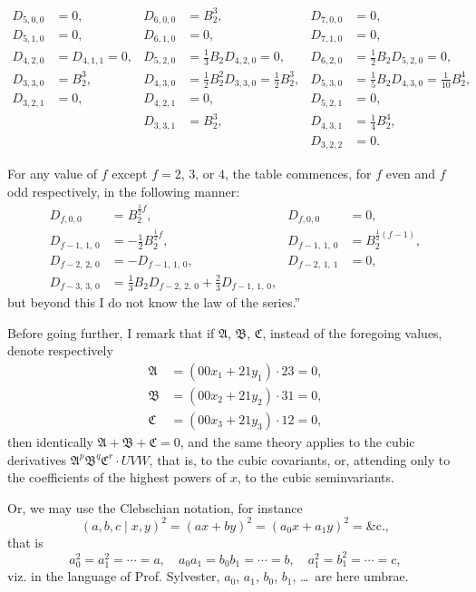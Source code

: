 \documentclass[11pt,a4paper]{article}
\theoremstyle{definition}
\begin{document}
\begin{align*}
D_{5,0,0} &= 0, & D_{6,0,0} &= B_2^3, & D_{7,0,0} &= 0,\\
D_{5,1,0} &= 0, & D_{6,1,0} &= 0, & D_{7,1,0} &= 0,\\
D_{4,2,0} &= D_{4,1,1} = 0, & D_{5,2,0} &= \tfrac{1}{3}B_2 D_{4,2,0} = 0, & D_{6,2,0} &= \tfrac{1}{2}B_2 D_{5,2,0} = 0,\\
D_{3,3,0} &= B_2^3, & D_{4,3,0} &= \tfrac{1}{2}B_2^2 D_{3,3,0} = \tfrac{1}{2}B_2^3, & D_{5,3,0} &= \tfrac{1}{5}B_2 D_{4,3,0} = \tfrac{1}{10}B_2^4,\\
D_{3,2,1} &= 0, & D_{4,2,1} &= 0, & D_{5,2,1} &= 0,\\
& & D_{3,3,1} &= B_2^3, & D_{4,3,1} &= \tfrac{1}{4}B_2^4,\\
& & & & D_{3,2,2} &= 0.
\end{align*}

For any value of $f$ except $f = 2$, $3$, or $4$, the table commences, for $f$ even and $f$ odd respectively, in the following manner:
\begin{align*}
D_{f,0,0} &= B_2^{\frac{1}{2}f}, & D_{f,0,0} &= 0,\\
D_{f-1,\,1,\,0} &= -\tfrac{1}{2}B_2^{\frac{1}{2}f}, & D_{f-1,\,1,\,0} &= B_2^{\frac{1}{2}(f-1)},\\
D_{f-2,\,2,\,0} &= -D_{f-1,\,1,\,0}, & D_{f-2,\,1,\,1} &= 0,\\
D_{f-3,\,3,\,0} &= \tfrac{1}{3}B_2 D_{f-2,\,2,\,0} + \tfrac{2}{3}D_{f-1,\,1,\,0},
\end{align*}
but beyond this I do not know the law of the series.''

Before going further, I remark that if $\mathfrak{A}$, $\mathfrak{B}$, $\mathfrak{C}$, instead of the foregoing values, denote respectively
\begin{align*}
\mathfrak{A} &= (00x_1 + 21y_1) \cdot 23 = 0,\\
\mathfrak{B} &= (00x_2 + 21y_2) \cdot 31 = 0,\\
\mathfrak{C} &= (00x_3 + 21y_3) \cdot 12 = 0,
\end{align*}
then identically $\mathfrak{A} + \mathfrak{B} + \mathfrak{C} = 0$, and the same theory applies to the cubic derivatives $\mathfrak{A}^p \mathfrak{B}^q \mathfrak{C}^r \cdot UVW$, that is, to the cubic covariants, or, attending only to the coefficients of the highest powers of $x$, to the cubic seminvariants.

Or, we may use the Clebschian notation, for instance
\[
(a, b, c \mid x, y)^2 = (ax + by)^2 = (a_0x + a_1y)^2 = \text{\&c.},
\]
that is
\[
a_0^2 = a_1^2 = \cdots = a, \quad a_0a_1 = b_0b_1 = \cdots = b, \quad a_1^2 = b_1^2 = \cdots = c,
\]
viz. in the language of Prof. Sylvester, $a_0$, $a_1$, $b_0$, $b_1$, \ldots\ are here umbrae.
\end{document}

